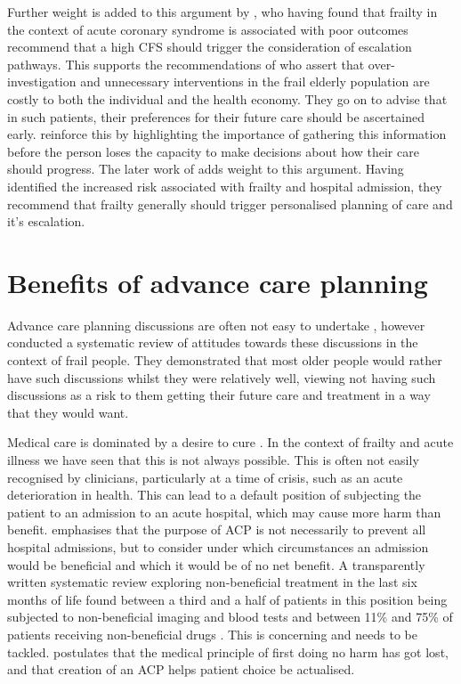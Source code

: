 \documentclass
[
	12pt,
	a4paper,
	oneside,
]{report}
\begin{document}
Further weight is added to this argument by \textcite{kang:15}, who having 
found that frailty in the 
context of acute coronary syndrome is associated
with poor outcomes recommend that a high CFS should
trigger the consideration of escalation pathways. 
This supports the recommendations of \textcite{silver:12} who assert that over-investigation
and unnecessary interventions in the frail elderly population are costly to both the
individual and the health economy. They go on to advise that in such patients, 
their preferences for their future care should be ascertained early. \textcite{oliver:14} 
reinforce this by highlighting the importance of gathering this information
before the person loses the capacity to make decisions about how their care should
progress. The later work of \textcite{romero-ortuno:16} adds weight to this argument.
Having identified the increased risk associated with frailty and hospital admission, 
they recommend that frailty generally should trigger personalised planning of
care and it's escalation.

\section{Benefits of advance care planning}

Advance care planning discussions are often not easy to undertake 
\parencite{taylor:17}, however \textcite{sharp:13} conducted a systematic
review of attitudes towards these discussions in the context of frail people. 
They demonstrated that most older people would rather have such discussions
whilst they were relatively well, viewing not having such discussions
as a risk to them getting their future care and treatment in a way
that they would want.

Medical care is dominated by a desire to cure \parencite{taylor:17}. In the 
context of frailty and acute illness we have seen that this is not always 
possible. This is often not easily recognised by clinicians, particularly
at a time of crisis, such as an acute deterioration in health. This can lead
to a default position of subjecting the patient to an admission to an acute
hospital, which may cause more harm than benefit. 
\textcite{waird:16} emphasises that the purpose of ACP is not necessarily
to prevent all hospital admissions, but to consider under which 
circumstances an admission would be beneficial and which it would be of
no net benefit. A transparently written 
systematic review exploring non-beneficial treatment in the last six months
of life found between a third and a half of patients in this position being
subjected to non-beneficial imaging and blood tests and between 11\% and
75\% of patients receiving non-beneficial drugs \parencite{cardona:16}.
This is concerning and needs to be tackled. \textcite{taylor:17} postulates
that the medical principle of first doing no harm has got lost, and that
creation of an ACP helps patient choice be actualised.
\end{document}

